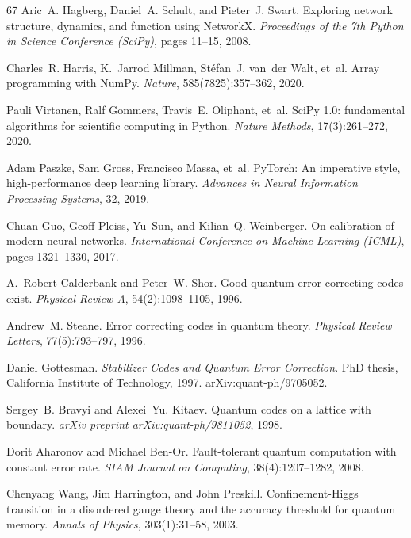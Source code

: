 \documentclass[aps,prxquantum,twocolumn,superscriptaddress,nofootinbib,longbibliography]{revtex4-2}
\begin{document}
\begin{thebibliography}{67}
Aric~A. Hagberg, Daniel~A. Schult, and Pieter~J. Swart. Exploring network
structure, dynamics, and function using {NetworkX}. \emph{Proceedings of the 7th
Python in Science Conference (SciPy)}, pages 11--15, 2008.

Charles~R. Harris, K.~Jarrod Millman, St{\'e}fan~J. van~der Walt, et~al. Array
programming with {NumPy}. \emph{Nature}, 585(7825):357--362, 2020.

Pauli Virtanen, Ralf Gommers, Travis~E. Oliphant, et~al. {SciPy} 1.0:
fundamental algorithms for scientific computing in {Python}. \emph{Nature
Methods}, 17(3):261--272, 2020.

Adam Paszke, Sam Gross, Francisco Massa, et~al. {PyTorch}: An imperative style,
high-performance deep learning library. \emph{Advances in Neural Information
Processing Systems}, 32, 2019.

Chuan Guo, Geoff Pleiss, Yu~Sun, and Kilian~Q. Weinberger. On calibration of
modern neural networks. \emph{International Conference on Machine Learning
(ICML)}, pages 1321--1330, 2017.

A.~Robert Calderbank and Peter~W. Shor. Good quantum error-correcting codes
exist. \emph{Physical Review A}, 54(2):1098--1105, 1996.

Andrew~M. Steane. Error correcting codes in quantum theory. \emph{Physical
Review Letters}, 77(5):793--797, 1996.

Daniel Gottesman. \emph{Stabilizer Codes and Quantum Error Correction}. PhD
thesis, California Institute of Technology, 1997.
\newblock arXiv:quant-ph/9705052.

Sergey~B. Bravyi and Alexei~Yu. Kitaev. Quantum codes on a lattice with
boundary. \emph{arXiv preprint arXiv:quant-ph/9811052}, 1998.

Dorit Aharonov and Michael Ben-Or. Fault-tolerant quantum computation with
constant error rate. \emph{SIAM Journal on Computing}, 38(4):1207--1282, 2008.

Chenyang Wang, Jim Harrington, and John Preskill. Confinement-{Higgs}
transition in a disordered gauge theory and the accuracy threshold for quantum
memory. \emph{Annals of Physics}, 303(1):31--58, 2003.


\end{thebibliography}
\end{document}
